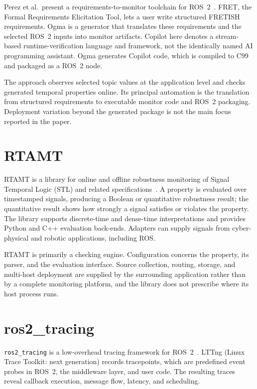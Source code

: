 Perez et al.\ present a requirements-to-monitor toolchain for
ROS~2~\cite{perez2022monitoringros2}. FRET, the Formal Requirements Elicitation
Tool, lets a user write structured FRETISH requirements. Ogma is a generator
that translates these requirements and the selected ROS~2 inputs into monitor
artifacts. Copilot here denotes a stream-based runtime-verification language
and framework, not the identically named AI programming assistant. Ogma
generates Copilot code, which is compiled to C99 and packaged as a ROS~2 node.

The approach observes selected topic values at the application level and checks
generated temporal properties online. Its principal automation is the
translation from structured requirements to executable monitor code and ROS~2
packaging. Deployment variation beyond the generated package is not the main
focus reported in the paper.

\section{RTAMT}

RTAMT is a library for online and offline robustness monitoring of Signal
Temporal Logic (STL) and related specifications~\cite{yamaguchi2024rtamt}. A
property is evaluated over timestamped signals, producing a Boolean or
quantitative robustness result; the quantitative result shows how strongly a
signal satisfies or violates the property. The library supports discrete-time
and dense-time interpretations and provides Python and C++ evaluation
back-ends. Adapters can supply signals from cyber-physical and robotic
applications, including ROS.

RTAMT is primarily a checking engine. Configuration concerns the property, its
parser, and the evaluation interface. Source collection, routing, storage, and
multi-host deployment are supplied by the surrounding application rather than
by a complete monitoring platform, and the library does not prescribe where
its host process runs.

\section{ros2\_tracing}

\texttt{ros2\_tracing} is a low-overhead tracing framework for
ROS~2~\cite{bedard2022ros2tracing}. LTTng (Linux Trace Toolkit: next
generation) records tracepoints, which are predefined event probes in ROS~2,
the middleware layer, and user code. The resulting traces reveal callback
execution, message flow, latency, and scheduling.

